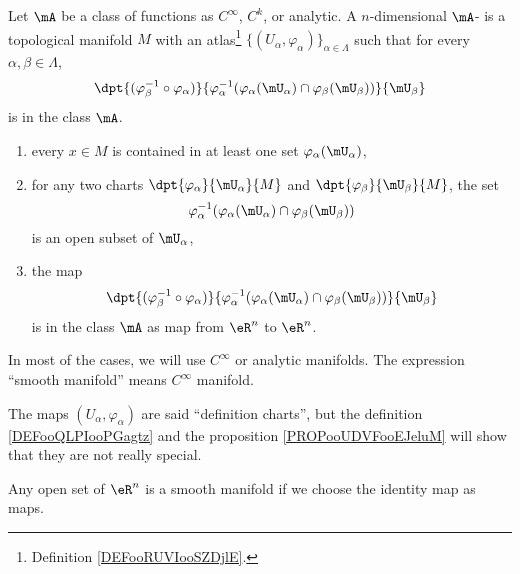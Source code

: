 \begin{definition}		\label{DEFooVMWRooGQYJwl}
	Let \( \mA\) be a class of functions as \(  C^{\infty}\), \( C^k\), or analytic. A $n$-dimensional \( \mA\)- is a topological manifold \( M\) with an atlas\footnote{Definition \ref{DEFooRUVIooSZDjlE}.} \( \{ (U_{\alpha}, \varphi_{\alpha}) \}_{\alpha\in\Lambda}\) such that for every \( \alpha,\beta\in\Lambda\),
	\begin{equation}
		\dpt{  (\varphi_{\beta}^{-1}\circ\varphi_{\alpha})  }{   \varphi_{\alpha}^{-1}( \varphi_{\alpha}(\mU_{\alpha})\cap\varphi_{\beta}(\mU_{\beta})  )   }{\mU_{\beta}}
	\end{equation}
	is in the class \( \mA\).


	\begin{enumerate}
		\item \label{ITEMooUOXXooAzRrAk}
		      every $x\in M$ is contained in at least one set $\varphi_{\alpha}(\mU_{\alpha})$,
		\item 	\label{ITEMooQHIYooBISPjL}
		      for any two charts $\dpt{\varphi_{\alpha}}{\mU_{\alpha}}{M}$ and $\dpt{\varphi_{\beta}}{\mU_{\beta}}{M}$, the set
		      \begin{equation}
			      \varphi_{\alpha}^{-1}( \varphi_{\alpha}(\mU_{\alpha})\cap\varphi_{\beta}(\mU_{\beta}) )
		      \end{equation}
		      is an open subset of $\mU_{\alpha}$,
		\item \label{ITEMooHICSooDrPwuV}
		      the map
		      \begin{equation}
			      \dpt{  (\varphi_{\beta}^{-1}\circ\varphi_{\alpha})  }{   \varphi_{\alpha}^{-1}( \varphi_{\alpha}(\mU_{\alpha})\cap\varphi_{\beta}(\mU_{\beta})  )   }{\mU_{\beta}}
		      \end{equation}
		      is in the class \( \mA\) as map from $\eR^n$ to $\eR^n$.
	\end{enumerate}
	In most of the cases, we will use \(  C^{\infty}\) or analytic manifolds. The expression ``smooth manifold'' means \(  C^{\infty}\) manifold.

	The maps \( (U_{\alpha}, \varphi_{\alpha})\) are said ``definition charts'', but the definition \ref{DEFooQLPIooPGagtz} and the proposition \ref{PROPooUDVFooEJeluM} will show that they are not really special.
\end{definition}

\begin{example}
	Any open set of $\eR^n$ is a smooth manifold if we choose the identity map as maps.
\end{example}

